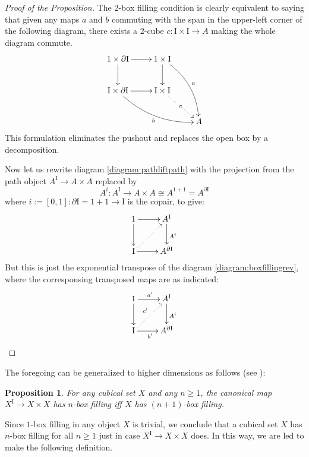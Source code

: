 \documentclass[12pt]{article}
\newcommand{\I}{\ensuremath{\mathrm{I}}}
\newtheorem{proposition}[theorem]{Proposition}
\theoremstyle{remark}
\theoremstyle{definition}
\begin{document}
\begin{proof}[Proof of the Proposition]
The 2-box filling condition is clearly equivalent to saying that given any maps $a$ and $b$ commuting with the span in the upper-left corner of the following diagram, there exists a 2-cube $c :  \I\times\I \to A$  making the whole diagram commute.  
\begin{equation}\label{diagram:boxfillingrev}
\xymatrix{
1\times \partial\I \ar[d] \ar[r]  & 1\times \I \ar[d] \ar@/{}^{1pc}/[rdd]^{a} \\
\I \times \partial\I \ar[r] \ar@/{}_{1pc}/[rrd]_{b} & \I\times\I \ar@{.>}[rd]|{c} \\
 &&  A
}
\end{equation}
This formulation eliminates the pushout and replaces the open box by a decomposition.

Now let us rewrite diagram \eqref{diagram:pathliftpath} with the projection from the path object $A^\I \to A\times A$  replaced by
\[
A^i : A^\I \to A\times A \cong A^{1+1} = A^{\partial\I} 
\] 
where $i := [0,1] : \partial \I = 1+1 \to \I$ is the copair, to give:
\begin{equation*}\label{diagram:pathliftpathrev}
\xymatrix{
1 \ar[d] \ar[r] & A^\I \ar[d]^{A^i} \\
\I \ar[r] \ar@{..>}[ru] & A^{\partial\I}
}
\end{equation*}
But this is just the exponential transpose of the diagram \eqref{diagram:boxfillingrev}, where the corresponsing transposed maps are as indicated:
\begin{equation}\label{diagram:pathliftpathrev}
\xymatrix{
1 \ar[d] \ar[r]^{a'} & A^\I \ar[d]^{A^i} \\
\I \ar[r]_{b'} \ar@{..>}[ru]^{c'} & A^{\partial\I}
}
\end{equation}
\end{proof}

The foregoing can be generalized to higher dimensions as follows (see \cite{awodey:cubes}):

\begin{proposition}\label{prop:main}
For any cubical set $X$ and any $n\geq 1$,  the canonical map $X^\I \to X\times X$ has $n$-box filling iff $X$ has $(n+1)$-box filling.
\end{proposition}

Since $1$-box filling in any object $X$ is trivial, we conclude that a cubical set $X$ has $n$-box filling for all $n\geq 1$ just in case $X^\I \to X\times X$ does.  In this way, we are led to make the following definition.
\end{document}
